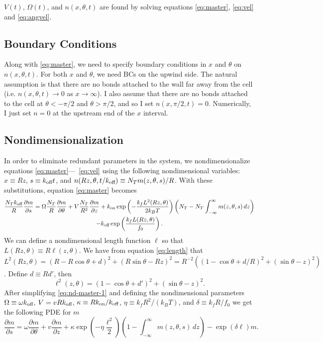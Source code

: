 \documentclass{article}
\newcommand{\dd}{d}
\newcommand{\Pder}[2]{\frac{\partial #1}{\partial #2}}
\newcommand{\Int}[4]{\int_{#3}^{#4} #1 \, \dd #2}
\newcommand{\tn}{\textnormal}
\begin{document}
$V(t)$, $\Omega(t)$, and $n(x, \theta, t)$ are found by solving
equations \eqref{eq:master}, \eqref{eq:vel} and \eqref{eq:angvel}.

\subsection{Boundary Conditions}
\label{sec:boundary-conditions}

Along with \eqref{eq:master}, we need to specify boundary conditions
in $x$ and $\theta$ on $n(x,\theta,t)$. For both $x$ and $\theta$, we
need BCs on the upwind side. The natural assumption is that there are
no bonds attached to the wall far away from the cell
(i.e. $n(x,\theta,t) \rightarrow 0$ as $x \rightarrow \infty$). I also
assume that there are no bonds attached to the cell at $\theta <
-\pi/2$ and $\theta > \pi/2$, and so I set $n(x, \pi/2, t) =
0$. Numerically, I just set $n = 0$ at the upstream end of the $x$
interval. %

\subsection{Nondimensionalization}
\label{sec:nond}

In order to eliminate redundant parameters in the system, we
nondimensionalize equations \eqref{eq:master}---~\eqref{eq:vel} using
the following nondimensional variables: $x \equiv R z$, $s \equiv
k_\tn{off} t$, and $n(R z, \theta, t/k_\tn{off}) \equiv N_T m(z, \theta,
s)/R$. With these substitutions, equation \eqref{eq:master} becomes 
\begin{multline}
  \label{eq:nd-master-1}
  \frac{N_T k_\tn{off}}{R} \Pder{m}{s} = \Omega \frac{N_T}{R}
  \Pder{m}{\theta} + V \frac{N_T}{R^2}\Pder{m}{z} + k_\tn{on}
  \exp\left( - \frac{k_f L^2(Rz, \theta)}{2 k_B T} \right) \left(N_T -
    N_T \Int{m(z, \theta, s)}{z}{-\infty}{\infty}\right) \\
  - k_\tn{off} \exp\left( \frac{k_f L(Rz, \theta)}{f_0} \right). 
\end{multline}
We can define a nondimensional length function $\ell$ so that $L(Rz,
\theta) \equiv R \ell(z, \theta)$. We have from equation
\eqref{eq:length} that $L^2(Rz, \theta) = (R - R \cos\theta + d)^2 +
(R \sin\theta - Rz)^2 = R^{-2} \left((1 - \cos\theta + d/R)^2 +
  (\sin\theta - z)^2 \right)$. Define $d \equiv R d'$, then
\begin{equation}
  \label{eq:nd-length}
  \ell^2(z, \theta) = (1 - \cos\theta + d')^2 + (\sin\theta - z)^2.
\end{equation}
After simplifying \eqref{eq:nd-master-1} and defining the
nondimensional parameters $\Omega \equiv \omega k_\tn{off}$, $V = v R
k_\tn{off}$, $\kappa \equiv R k_\tn{on}/k_\tn{off}$, $\eta \equiv k_f
R^2/(k_B T)$, and $\delta \equiv k_f R/f_0$ we get the following PDE
for $m$
\begin{equation}
  \label{eq:nd-master}
  \Pder{m}{s} = \omega \Pder{m}{\theta} + v \Pder{m}{z} + \kappa
  \exp\left(-\eta \frac{\ell^2}{2}\right) \left(1 - \Int{m(z, \theta,
    s)}{z}{-\infty}{\infty} \right) - \exp(\delta \ell) m.
\end{equation}
\end{document}

